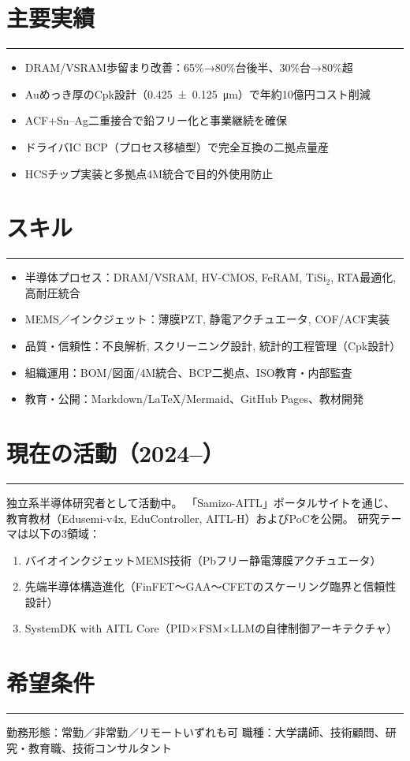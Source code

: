 \documentclass[11pt]{bxjsarticle}
\newcommand{\cvsection}[1]{\section*{#1}\vspace{-0.3em}\hrule\vspace{0.5em}}
\begin{document}
\cvsection{主要実績}
\begin{itemize}
  \item DRAM/VSRAM歩留まり改善：65\%→80\%台後半、30\%台→80\%超
  \item Auめっき厚のCpk設計（\SI{0.425 \pm 0.125}{\micro\metre}）で年約10億円コスト削減
  \item ACF+Sn–Ag二重接合で鉛フリー化と事業継続を確保
  \item ドライバIC BCP（プロセス移植型）で完全互換の二拠点量産
  \item HCSチップ実装と多拠点4M統合で目的外使用防止
\end{itemize}

\cvsection{スキル}
\begin{itemize}
  \item 半導体プロセス：DRAM/VSRAM, HV-CMOS, FeRAM, TiSi$_2$, RTA最適化, 高耐圧統合
  \item MEMS／インクジェット：薄膜PZT, 静電アクチュエータ, COF/ACF実装
  \item 品質・信頼性：不良解析, スクリーニング設計, 統計的工程管理（Cpk設計）
  \item 組織運用：BOM/図面/4M統合、BCP二拠点、ISO教育・内部監査
  \item 教育・公開：Markdown/LaTeX/Mermaid、GitHub Pages、教材開発
\end{itemize}

\cvsection{現在の活動（2024–）}
独立系半導体研究者として活動中。  
「Samizo-AITL」ポータルサイトを通じ、教育教材（Edusemi-v4x, EduController, AITL-H）およびPoCを公開。  
研究テーマは以下の3領域：
\begin{enumerate}
  \item バイオインクジェットMEMS技術（Pbフリー静電薄膜アクチュエータ）
  \item 先端半導体構造進化（FinFET～GAA～CFETのスケーリング臨界と信頼性設計）
  \item SystemDK with AITL Core（PID×FSM×LLMの自律制御アーキテクチャ）
\end{enumerate}

\cvsection{希望条件}
勤務形態：常勤／非常勤／リモートいずれも可  
職種：大学講師、技術顧問、研究・教育職、技術コンサルタント
\end{document}
